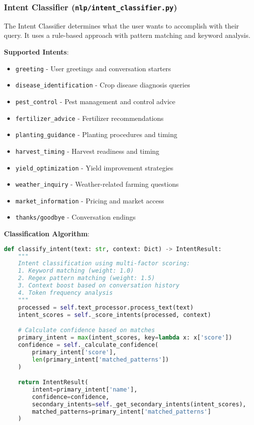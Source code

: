 \documentclass[12pt,a4paper]{article}
\begin{document}
\subsubsection{Intent Classifier (\texttt{nlp/intent\_classifier.py})}

The Intent Classifier determines what the user wants to accomplish with their query. It uses a rule-based approach with pattern matching and keyword analysis.

\textbf{Supported Intents}:
\begin{itemize}[leftmargin=*]
    \item \texttt{greeting} - User greetings and conversation starters
    \item \texttt{disease\_identification} - Crop disease diagnosis queries
    \item \texttt{pest\_control} - Pest management and control advice
    \item \texttt{fertilizer\_advice} - Fertilizer recommendations
    \item \texttt{planting\_guidance} - Planting procedures and timing
    \item \texttt{harvest\_timing} - Harvest readiness and timing
    \item \texttt{yield\_optimization} - Yield improvement strategies
    \item \texttt{weather\_inquiry} - Weather-related farming questions
    \item \texttt{market\_information} - Pricing and market access
    \item \texttt{thanks/goodbye} - Conversation endings
\end{itemize}

\textbf{Classification Algorithm}:
\begin{lstlisting}[language=Python, caption=Intent Classification Process]
def classify_intent(text: str, context: Dict) -> IntentResult:
    """
    Intent classification using multi-factor scoring:
    1. Keyword matching (weight: 1.0)
    2. Regex pattern matching (weight: 1.5)
    3. Context boost based on conversation history
    4. Token frequency analysis
    """
    processed = self.text_processor.process_text(text)
    intent_scores = self._score_intents(processed, context)

    # Calculate confidence based on matches
    primary_intent = max(intent_scores, key=lambda x: x['score'])
    confidence = self._calculate_confidence(
        primary_intent['score'],
        len(primary_intent['matched_patterns'])
    )

    return IntentResult(
        intent=primary_intent['name'],
        confidence=confidence,
        secondary_intents=self._get_secondary_intents(intent_scores),
        matched_patterns=primary_intent['matched_patterns']
    )
\end{lstlisting}
\end{document}

